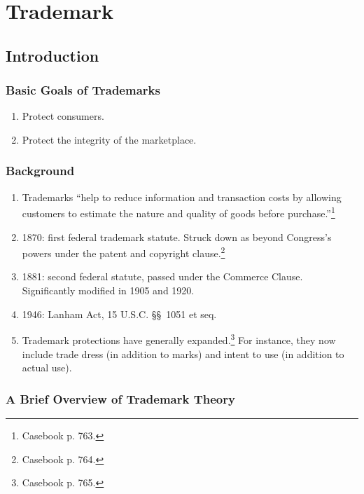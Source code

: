 \section{Trademark}

\subsection{Introduction}

\subsubsection{Basic Goals of Trademarks}

\begin{enumerate}
    \item Protect consumers.
    \item Protect the integrity of the marketplace.
\end{enumerate}

\subsubsection{Background}

\begin{enumerate}
    \item Trademarks ``help to reduce information and transaction costs by 
    allowing customers to estimate the nature and quality of goods before 
    purchase.''\footnote{Casebook p. 763.}
    \item 1870: first federal trademark statute. Struck down as beyond 
    Congress's powers under the patent and copyright clause.\footnote{Casebook 
    p. 764.}
    \item 1881: second federal statute, passed under the Commerce Clause. 
    Significantly modified in 1905 and 1920.
    \item 1946: Lanham Act, 15 U.S.C. \S\S\ 1051 et seq.
    \item Trademark protections have generally expanded.\footnote{Casebook p. 
    765.} For instance, they now include trade dress (in addition to marks) 
    and intent to use (in addition to actual use).
\end{enumerate}

\subsubsection{A Brief Overview of Trademark Theory}

